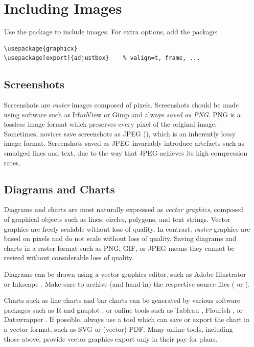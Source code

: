\section{Including Images}

Use the  package to include images.
For extra options, add the  package:
\begin{lstlisting}
\usepackage{graphicx}
\usepackage[export]{adjustbox}    % valign=t, frame, ...
\end{lstlisting}






\subsection{Screenshots}

Screenshots are \emph{raster} images composed of pixels. Screenshots
should be made using software such as IrfanView or Gimp and always
\emph{saved as PNG}. PNG is a lossless image format which preserves
every pixel of the original image. Sometimes, novices save screenshots
as JPEG (), which is an inherently lossy image
format. Screenshots saved as JPEG invariably introduce artefacts such
as smudged lines and text, due to the way that JPEG achieves its high
compression rates.




\subsection{Diagrams and Charts}

Diagrams and charts are most naturally expressed as \emph{vector
  graphics}, composed of graphical objects such as lines, circles,
polygons, and text strings. Vector graphics are freely scalable
without loss of quality. In contrast, \emph{raster} graphics are based
on pixels and do not scale without loss of quality. Saving diagrams
and charts in a raster format such as PNG, GIF, or JPEG means they
cannot be resized without considerable loss of quality.

Diagrams can be drawn using a vector graphics editor, such as Adobe
Illustrator \parencite{Adobe-Illustrator} or Inkscape
\parencite{Inkscape}. Make sure to archive (and hand-in) the
respective source files ( or ).


Charts such as line charts and bar charts can be generated by various
software packages such as R \parencite{R-Project} and gnuplot
\parencite{gnuplot}, or online tools such as Tableau \parencite{Tableau},
Flourish \parencite{Flourish}, or Datawrapper \parencite{Datawrapper}.
%
If possible, always use a tool which can save or export the chart in a
vector format, such as SVG or (vector) PDF. Many online tools,
including those above, provide vector graphics export only in their
pay-for plans.


